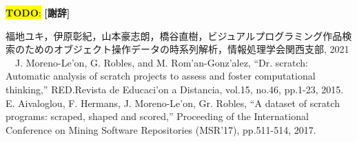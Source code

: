 \documentclass[uplatex,dvipdfmx,a4paper,twocolumn,base=11pt,jbase=11pt,ja=standard]{bxjsarticle}  %
\newcommand{\todo}[1]{\colorbox{yellow}{{\bf TODO}:}{\color{red} {\textbf{[#1]}}}}
\begin{document}
\todo{謝辞}

\begin{thebibliography}{1}
   福地ユキ，伊原彰紀，山本豪志朗，橋谷直樹，ビジュアルプログラミング作品検索のためのオブジェクト操作データの時系列解析，情報処理学会関西支部, 2021
  　J. Moreno-Le'on, G. Robles, and M. Rom'an-Gonz'alez, ``Dr. scratch: Automatic analysis of scratch projects to assess and foster computational thinking,'' RED.Revista de Educaci'on a Distancia, vol.15, no.46, pp.1-23, 2015.
   E. Aivaloglou, F. Hermans, J. Moreno-Le'on, Gr. Robles, ``A dataset of scratch programs: scraped, shaped and scored,'' Proceeding of the International Conference on Mining Software Repositories (MSR'17), pp.511-514, 2017. 

\end{thebibliography}





%
\end{document}
